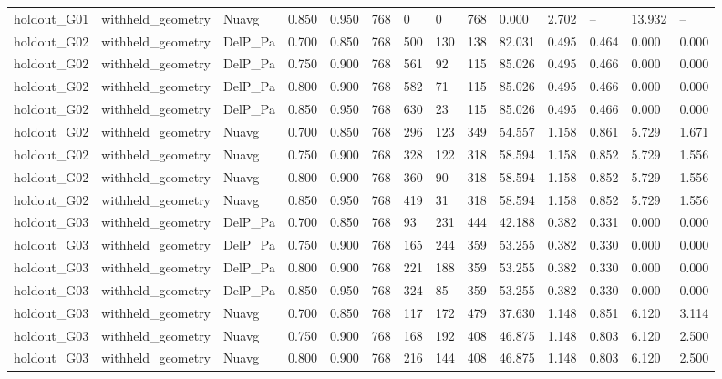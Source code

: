\begin{tabular}{llllllllllllll}
holdout_G01 & withheld_geometry & Nuavg & 0.850 & 0.950 & 768 & 0 & 0 & 768 & 0.000 & 2.702 & -- & 13.932 & -- \\
holdout_G02 & withheld_geometry & DelP_Pa & 0.700 & 0.850 & 768 & 500 & 130 & 138 & 82.031 & 0.495 & 0.464 & 0.000 & 0.000 \\
holdout_G02 & withheld_geometry & DelP_Pa & 0.750 & 0.900 & 768 & 561 & 92 & 115 & 85.026 & 0.495 & 0.466 & 0.000 & 0.000 \\
holdout_G02 & withheld_geometry & DelP_Pa & 0.800 & 0.900 & 768 & 582 & 71 & 115 & 85.026 & 0.495 & 0.466 & 0.000 & 0.000 \\
holdout_G02 & withheld_geometry & DelP_Pa & 0.850 & 0.950 & 768 & 630 & 23 & 115 & 85.026 & 0.495 & 0.466 & 0.000 & 0.000 \\
holdout_G02 & withheld_geometry & Nuavg & 0.700 & 0.850 & 768 & 296 & 123 & 349 & 54.557 & 1.158 & 0.861 & 5.729 & 1.671 \\
holdout_G02 & withheld_geometry & Nuavg & 0.750 & 0.900 & 768 & 328 & 122 & 318 & 58.594 & 1.158 & 0.852 & 5.729 & 1.556 \\
holdout_G02 & withheld_geometry & Nuavg & 0.800 & 0.900 & 768 & 360 & 90 & 318 & 58.594 & 1.158 & 0.852 & 5.729 & 1.556 \\
holdout_G02 & withheld_geometry & Nuavg & 0.850 & 0.950 & 768 & 419 & 31 & 318 & 58.594 & 1.158 & 0.852 & 5.729 & 1.556 \\
holdout_G03 & withheld_geometry & DelP_Pa & 0.700 & 0.850 & 768 & 93 & 231 & 444 & 42.188 & 0.382 & 0.331 & 0.000 & 0.000 \\
holdout_G03 & withheld_geometry & DelP_Pa & 0.750 & 0.900 & 768 & 165 & 244 & 359 & 53.255 & 0.382 & 0.330 & 0.000 & 0.000 \\
holdout_G03 & withheld_geometry & DelP_Pa & 0.800 & 0.900 & 768 & 221 & 188 & 359 & 53.255 & 0.382 & 0.330 & 0.000 & 0.000 \\
holdout_G03 & withheld_geometry & DelP_Pa & 0.850 & 0.950 & 768 & 324 & 85 & 359 & 53.255 & 0.382 & 0.330 & 0.000 & 0.000 \\
holdout_G03 & withheld_geometry & Nuavg & 0.700 & 0.850 & 768 & 117 & 172 & 479 & 37.630 & 1.148 & 0.851 & 6.120 & 3.114 \\
holdout_G03 & withheld_geometry & Nuavg & 0.750 & 0.900 & 768 & 168 & 192 & 408 & 46.875 & 1.148 & 0.803 & 6.120 & 2.500 \\
holdout_G03 & withheld_geometry & Nuavg & 0.800 & 0.900 & 768 & 216 & 144 & 408 & 46.875 & 1.148 & 0.803 & 6.120 & 2.500 \\

\end{tabular}
